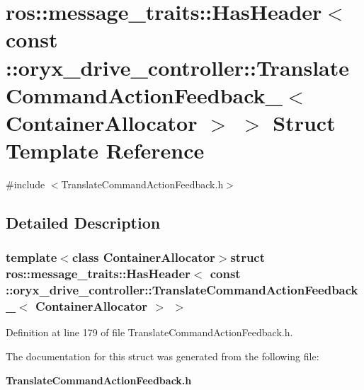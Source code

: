 \section{ros\-:\-:message\-\_\-traits\-:\-:\-Has\-Header$<$ const \-:\-:oryx\-\_\-drive\-\_\-controller\-:\-:\-Translate\-Command\-Action\-Feedback\-\_\-$<$ \-Container\-Allocator $>$ $>$ \-Struct \-Template \-Reference}
\label{structros_1_1message__traits_1_1HasHeader_3_01const_01_1_1oryx__drive__controller_1_1TranslateCo515c6fa8894992db079f23c40e29d930}


{\ttfamily \#include $<$\-Translate\-Command\-Action\-Feedback.\-h$>$}



\subsection{\-Detailed \-Description}
\subsubsection*{template$<$class Container\-Allocator$>$struct ros\-::message\-\_\-traits\-::\-Has\-Header$<$ const \-::oryx\-\_\-drive\-\_\-controller\-::\-Translate\-Command\-Action\-Feedback\-\_\-$<$ Container\-Allocator $>$ $>$}



\-Definition at line 179 of file \-Translate\-Command\-Action\-Feedback.\-h.



\-The documentation for this struct was generated from the following file\-:\begin{DoxyCompactItemize}
\item 
{\bf \-Translate\-Command\-Action\-Feedback.\-h}\end{DoxyCompactItemize}
